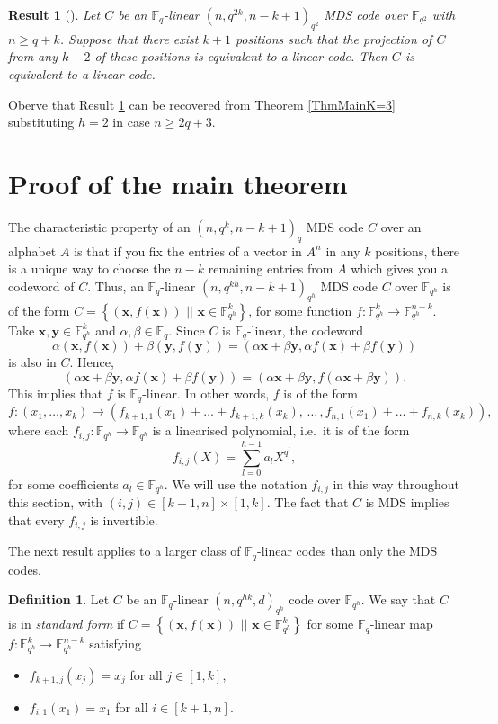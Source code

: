\documentclass[a4paper]{article}
\newtheorem{res}[thm]{Result}
\theoremstyle{definition}
\newtheorem{df}[thm]{Definition}
\newcommand{\FF}{\mathbb F}
\newcommand{\sett}[2]{ \left\{ #1 \, \, || \, \, #2 \right \} }
\newcommand{\xx}{\mathbf x}
\newcommand{\yy}{\mathbf y}
\begin{document}
\begin{res}[{\cite{gamboa}}]
 \label{ResGamboaCodes}
Let $C$ be an $\FF_q$-linear $(n,q^{2k},n-k+1)_{q^2}$ MDS code over $\FF_{q^2}$ with $n \geq q+k$.
Suppose that there exist $k+1$ positions such that the projection of $C$ from any $k-2$ of these positions is equivalent to a linear code.
Then $C$ is equivalent to a linear code.
\end{res}

Oberve that Result \ref{ResGamboaCodes} can be recovered from Theorem \ref{ThmMainK=3} substituting $h=2$ in case $n \geq 2q+3$.








\section{Proof of the main theorem}
 \label{SecMain}

The characteristic property of an $(n,q^k,n-k+1)_q$ MDS code $C$ over an alphabet $A$ is that if you fix the entries of a vector in $A^n$ in any $k$ positions, there is a unique way to choose the $n-k$ remaining entries from $A$ which gives you a codeword of $C$.
Thus, an $\FF_q$-linear $(n,q^{kh},n-k+1)_{q^h}$ MDS code $C$ over $\FF_{q^h}$ is of the form $C = \sett{ (\xx,f(\xx)) }{ \xx \in \FF_{q^h}^k }$,
for some function $f: \FF_{q^h}^k \to \FF_{q^h}^{n-k}$.
Take $\xx, \yy \in \FF_{q^h}^k$ and $\alpha, \beta \in \FF_q$.
Since $C$ is $\FF_q$-linear, the codeword
\[
 \alpha (\xx,f(\xx)) + \beta(\yy,f(\yy)) = (\alpha \xx + \beta \yy, \alpha f(\xx) + \beta f(\yy))
\]
is also in $C$.
Hence,
\[
 (\alpha \xx + \beta \yy, \alpha f(\xx) + \beta f(\yy)) = (\alpha \xx + \beta \yy, f(\alpha \xx + \beta \yy)).
\] 
This implies that $f$ is $\FF_q$-linear.
In other words, $f$ is of the form
\[
 f: (x_1,\dots,x_k) \mapsto (f_{k+1,1}(x_1) + \ldots + f_{k+1,k}(x_k),\, \dots \,, f_{n,1}(x_1) + \ldots + f_{n,k}(x_k)),
\]
where each $f_{i,j}:\FF_{q^h} \to \FF_{q^h}$ is a linearised polynomial, i.e.\ it is of the form
\[
 f_{i,j}(X) = \sum_{l=0}^{h-1} a_l X^{q^l},
\]
for some coefficients $a_l \in \FF_{q^h}$.
We will use the notation $f_{i,j}$ in this way throughout this section, with $(i,j) \in [k+1,n] \times [1,k]$.
The fact that $C$ is MDS implies that every $f_{i,j}$ is invertible.

The next result applies to a larger class of $\FF_q$-linear codes than only the MDS codes.

\begin{df}
Let $C$ be an $\FF_q$-linear $(n,q^{hk},d)_{q^h}$ code over $\FF_{q^h}$.
We say that $C$ is in \emph{standard form} if
\(
 C = \sett{ (\xx, f(\xx)) }{ \xx \in \FF_{q^h}^k }
\)
for some $\FF_q$-linear map
\( f: \FF_{q^h}^k \to \FF_{q^h}^{n-k} \) satisfying
\begin{itemize}
 \item $f_{k+1,j}(x_j) = x_j$ for all $j \in [1,k]$,
 \item $f_{i,1}(x_1) = x_1$ for all $i \in [k+1,n]$.
\end{itemize}
\end{df}
\end{document}
